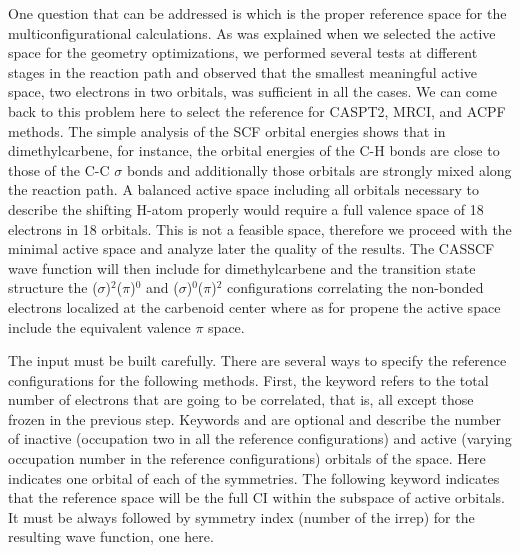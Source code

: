 
One question that can be addressed is which is the proper reference space
for the multiconfigurational calculations. As was explained when we selected
the active space for the geometry optimizations, we performed several tests
at different stages in the reaction path and observed that the smallest
meaningful active space, two electrons in two orbitals, was sufficient
in all the cases. We can come back to this problem here to select the
reference for CASPT2, MRCI, and ACPF methods. The simple analysis of the
SCF orbital energies shows that in dimethylcarbene, for instance, the
orbital energies of the C-H bonds are close to those of the C-C $\sigma$
bonds and additionally those orbitals are strongly mixed along
the reaction path. A balanced active space including all orbitals necessary
to describe the shifting H-atom properly would require a full valence
space of 18 electrons in 18 orbitals. This is not a feasible space, therefore
we proceed with the minimal active space and analyze later the quality
of the results. The CASSCF wave function will then include for dimethylcarbene
and the transition state structure the ($\sigma$)$^2$($\pi$)$^0$ and
($\sigma$)$^0$($\pi$)$^2$ configurations correlating the non-bonded electrons
localized at the carbenoid center where as for propene the active space
include the equivalent valence $\pi$ space.


The  input must be built carefully. There are several
ways to specify the reference configurations for the following methods.
First, the keyword  refers to the total number of
electrons that are going to be correlated, that is, all except those
frozen in the previous  step. 
Keywords  and 
 are optional and describe the number of inactive
(occupation two in all the reference configurations) and active
(varying occupation number in the reference configurations) orbitals
of the space. Here  indicates one orbital of each
of the symmetries. The following keyword  indicates
that the reference space will be the full CI within the subspace
of active orbitals. It must be always followed by symmetry index
(number of the irrep) for the resulting wave function, one here. 

